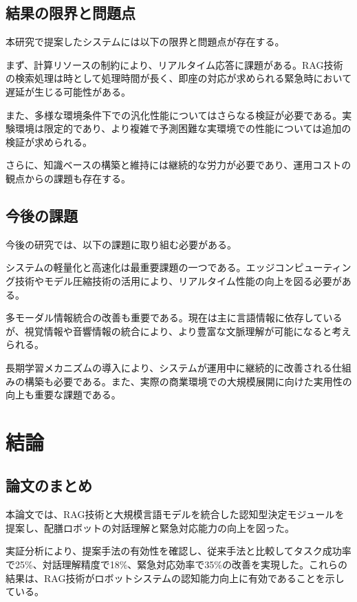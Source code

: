 \documentclass[12pt]{report}
\begin{document}
\section{結果の限界と問題点}
\label{sec:limitations}

本研究で提案したシステムには以下の限界と問題点が存在する。

まず、計算リソースの制約により、リアルタイム応答に課題がある。RAG技術の検索処理は時として処理時間が長く、即座の対応が求められる緊急時において遅延が生じる可能性がある。

また、多様な環境条件下での汎化性能についてはさらなる検証が必要である。実験環境は限定的であり、より複雑で予測困難な実環境での性能については追加の検証が求められる。

さらに、知識ベースの構築と維持には継続的な労力が必要であり、運用コストの観点からの課題も存在する。

\section{今後の課題}
\label{sec:future_work}

今後の研究では、以下の課題に取り組む必要がある。

システムの軽量化と高速化は最重要課題の一つである。エッジコンピューティング技術やモデル圧縮技術の活用により、リアルタイム性能の向上を図る必要がある。

多モーダル情報統合の改善も重要である。現在は主に言語情報に依存しているが、視覚情報や音響情報の統合により、より豊富な文脈理解が可能になると考えられる。

長期学習メカニズムの導入により、システムが運用中に継続的に改善される仕組みの構築も必要である。また、実際の商業環境での大規模展開に向けた実用性の向上も重要な課題である。

\chapter{結論}
\label{chap:conclusion}

\section{論文のまとめ}
\label{sec:summary}

本論文では、RAG技術と大規模言語モデルを統合した認知型決定モジュールを提案し、配膳ロボットの対話理解と緊急対応能力の向上を図った。

実証分析により、提案手法の有効性を確認し、従来手法と比較してタスク成功率で25\%、対話理解精度で18\%、緊急対応効率で35\%の改善を実現した。これらの結果は、RAG技術がロボットシステムの認知能力向上に有効であることを示している。
\end{document}
